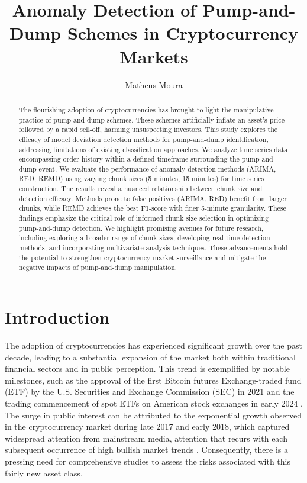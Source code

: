 \documentclass[12pt]{article}
\title{Anomaly Detection of Pump-and-Dump Schemes in Cryptocurrency Markets}
\author{Matheus Moura\inst{1}}
\begin{document}
 
	
	\maketitle
	
	\begin{abstract} 
		The flourishing adoption of cryptocurrencies has brought to light the manipulative practice of pump-and-dump schemes.
		These schemes artificially inflate an asset's price followed by a rapid sell-off, harming unsuspecting investors. This study explores the efficacy of model deviation detection methods for pump-and-dump identification, addressing limitations of existing classification approaches. We analyze time series data encompassing order history within a defined timeframe surrounding the pump-and-dump event.
		We evaluate the performance of anomaly detection methods (ARIMA, RED, REMD) using varying chunk sizes (5 minutes, 15 minutes) for time series construction.
		The results reveal a nuanced relationship between chunk size and detection efficacy.
		Methods prone to false positives (ARIMA, RED) benefit from larger chunks, while REMD achieves the best F1-score with finer 5-minute granularity.
		These findings emphasize the critical role of informed chunk size selection in optimizing pump-and-dump detection. 
		We highlight promising avenues for future research, including exploring a broader range of chunk sizes, developing real-time detection methods, and incorporating multivariate analysis techniques.
		These advancements hold the potential to strengthen cryptocurrency market surveillance and mitigate the negative impacts of pump-and-dump manipulation.
	\end{abstract}
	
	\section{Introduction}
	\label{sec_introducao}

	The adoption of cryptocurrencies has experienced significant growth over the past decade, leading to a substantial expansion of the market both within traditional financial sectors and in public perception.
	This trend is exemplified by notable milestones, such as the approval of the first Bitcoin futures Exchange-traded fund (ETF) by the U.S. Securities and Exchange Commission (SEC) in 2021 \citep{wursthorn2021} and the trading commencement of spot ETFs on American stock exchanges in early 2024 \citep{schmitt2024}.
	The surge in public interest can be attributed to the exponential growth observed in the cryptocurrency market during late 2017 and early 2018, which captured widespread attention from mainstream media, attention that recurs with each subsequent occurrence of high bullish market trends \citep{steinmetz2021}.
	Consequently, there is a pressing need for comprehensive studies to assess the risks associated with this fairly new asset class.
\end{document}

